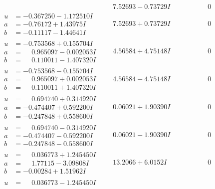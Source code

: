 \documentclass[1p]{elsarticle_modified}
\theoremstyle{definition}
\begin{document}
$$\begin{array}{c|c|c}
 & \phantom{-}7.52693 - 0.73729 I & \phantom{-0.000000 } 0 \\ \hline\begin{aligned}
u &= -0.367250 - 1.172510 I \\
a &= -0.76172 + 1.43975 I \\
b &= -0.11117 - 1.44641 I\end{aligned}
 & \phantom{-}7.52693 + 0.73729 I & \phantom{-0.000000 } 0 \\ \hline\begin{aligned}
u &= -0.753568 + 0.155704 I \\
a &= \phantom{-}0.965097 - 0.002053 I \\
b &= \phantom{-}0.110011 - 1.407320 I\end{aligned}
 & \phantom{-}4.56584 + 4.75148 I & \phantom{-0.000000 } 0 \\ \hline\begin{aligned}
u &= -0.753568 - 0.155704 I \\
a &= \phantom{-}0.965097 + 0.002053 I \\
b &= \phantom{-}0.110011 + 1.407320 I\end{aligned}
 & \phantom{-}4.56584 - 4.75148 I & \phantom{-0.000000 } 0 \\ \hline\begin{aligned}
u &= \phantom{-}0.694740 + 0.314920 I \\
a &= -0.474407 + 0.592200 I \\
b &= -0.247848 + 0.558600 I\end{aligned}
 & \phantom{-}0.06021 + 1.90390 I & \phantom{-0.000000 } 0 \\ \hline\begin{aligned}
u &= \phantom{-}0.694740 - 0.314920 I \\
a &= -0.474407 - 0.592200 I \\
b &= -0.247848 - 0.558600 I\end{aligned}
 & \phantom{-}0.06021 - 1.90390 I & \phantom{-0.000000 } 0 \\ \hline\begin{aligned}
u &= \phantom{-}0.036773 + 1.245450 I \\
a &= \phantom{-}1.77115 - 3.09808 I \\
b &= -0.00284 + 1.51962 I\end{aligned}
 & \phantom{-}13.2066 + 6.0152 I & \phantom{-0.000000 } 0 \\ \hline\begin{aligned}
u &= \phantom{-}0.036773 - 1.245450 I \\

\end{aligned}
\end{array}$$
\end{document}
